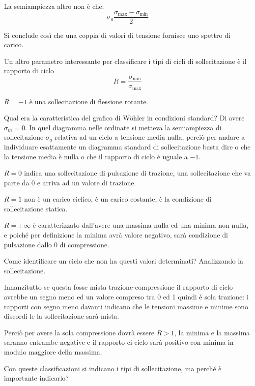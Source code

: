\documentclass{article}
\begin{document}
\begin{adjustwidth}{2in}{}
		La semiampiezza altro non è che:
		\[\sigma_a\dfrac{\sigma_{\max}-\sigma_{\min}}{2}\]
		
		Si conclude così che una coppia di valori di tensione fornisce uno spettro di carico. \newline 
		
		Un altro parametro interessante per classificare i tipi di cicli di sollecitazione è il rapporto di ciclo
		\[R= \dfrac{\sigma_{\min}}{\sigma_{\max}}\]
		
		\textbf{$ R = -1 $} è una sollecitazione di flessione rotante. 
		
		Qual era la caratteristica del grafico di Wöhler in condizioni standard? Di avere $\sigma_m  = 0$. 
		In quel diagramma nelle ordinate si metteva la semiampiezza di sollecitazione $\sigma_a$ relativa ad un ciclo a tensione media nulla, perciò per andare a individuare esattamente un diagramma standard di sollecitazione basta dire o che la tensione media è nulla o che il rapporto di ciclo è uguale a $ -1 $. 
		
		\textbf{$R=0$} indica una sollecitazione di pulsazione di trazione, una sollecitazione che va parte da 0 e arriva ad un valore di trazione. 
		
		\textbf{$R=1$} non è un carico ciclico, è un carico costante, è la condizione di sollecitazione statica.
		 
		\textbf{$R=\pm\infty$} è caratterizzato dall'avere una massima nulla ed una minima non nulla, e poiché per definizione la minima avrà valore negativo, sarà condizione di pulsazione dallo 0 di compressione. \newline
		 
		Come identificare un ciclo che non ha questi valori determinati? Analizzando la sollecitazione.
		
		Innanzitutto se questa fosse mista trazione-compressione il rapporto di ciclo avrebbe un segno meno ed un valore compreso tra 0 ed 1 quindi è sola trazione: i rapporti con segno meno davanti indicano che le tensioni massime e minime sono discordi le la sollecitazione sarà mista. 
		
		Perciò per avere la sola compressione dovrà essere $R>1$, la minima e la massima saranno entrambe negative e il rapporto ci ciclo sarà positivo con minima in modulo maggiore della massima. \newline
		 
		Con queste classificazioni si indicano i tipi di sollecitazione, ma perché è importante indicarlo?
		

\end{adjustwidth}
\end{document}
